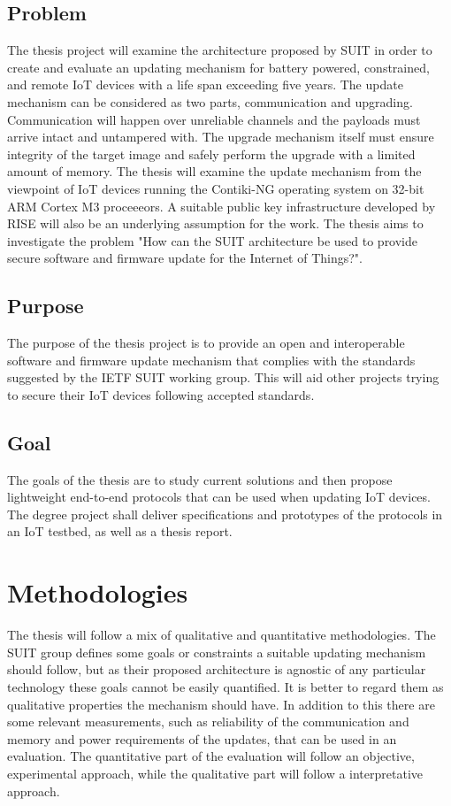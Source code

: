 \documentclass[0-thesis.tex]{subfiles}
\begin{document}
\subsection{Problem}
The thesis project will examine the architecture proposed by SUIT in order to create and evaluate an 
updating mechanism for battery powered, constrained, and remote IoT devices with a life span 
exceeding five years. The update mechanism can be considered as two parts, communication and upgrading.
Communication will happen over unreliable channels and the payloads must arrive intact and untampered 
with. The upgrade mechanism itself must ensure integrity of the target image and safely perform the 
upgrade with a limited amount of memory. The thesis will examine the update mechanism from the viewpoint 
of IoT devices running the Contiki-NG operating system on 32-bit ARM Cortex M3 proceeeors. A suitable 
public key infrastructure developed by RISE will also be an underlying assumption for the work. The thesis 
aims to investigate the problem "How can the SUIT architecture be used to provide secure software and firmware 
update for the Internet of Things?".

\subsection{Purpose}
The purpose of the thesis project is to provide an open and interoperable software and firmware update 
mechanism that complies with the standards suggested by the IETF SUIT working group. This will aid other 
projects trying to secure their IoT devices following accepted standards.

\subsection{Goal}
The goals of the thesis are to study current solutions and then propose lightweight end-to-end protocols 
that can be used when updating IoT devices. The degree project shall deliver specifications and prototypes
of the protocols in an IoT testbed, as well as a thesis report.

\section{Methodologies}
The thesis will follow a mix of qualitative and quantitative methodologies. The SUIT group defines some 
goals or constraints a suitable updating mechanism should follow, but as their proposed architecture is 
agnostic of any particular technology these goals cannot be easily quantified. It is better to regard them 
as qualitative properties the mechanism should have. In addition to this there are some relevant measurements,
such as reliability of the communication and memory and power requirements of the updates, that can be used 
in an evaluation. The quantitative part of the evaluation will follow an objective, experimental approach, while 
the qualitative part will follow a interpretative approach.
\end{document}
